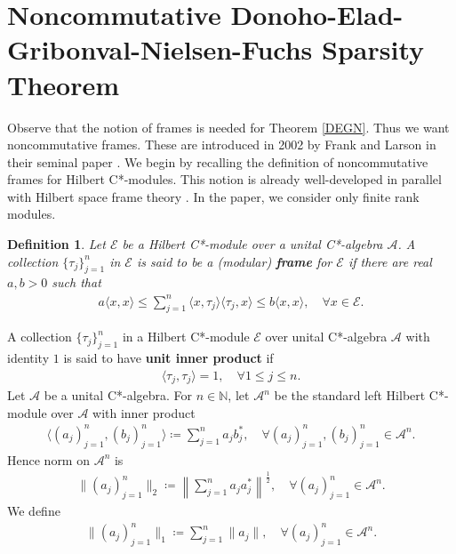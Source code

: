 \documentclass{amsart}
\newtheorem{definition}[theorem]{Definition}
\begin{document}
\section{Noncommutative Donoho-Elad-Gribonval-Nielsen-Fuchs Sparsity Theorem}
 Observe that the notion of frames is needed for Theorem \ref{DEGN}. Thus we want noncommutative frames. These are introduced in 2002 by Frank and Larson in their seminal paper \cite{FRANKLARSON}. We begin by  recalling  the definition of noncommutative  frames for Hilbert C*-modules. This notion is already well-developed in parallel with Hilbert space frame theory \cite{RAEBURNTHOMPSON, ARAMBASIC, HANJINGMOHAPATRA}. In the paper, 	we consider only finite rank modules. 
\begin{definition}\cite{FRANKLARSON}
	Let 	 $\mathcal{E}$ be a Hilbert C*-module over a  unital C*-algebra $\mathcal{A}$. A collection $\{\tau_j\}_{j=1}^n $ in  $\mathcal{E}$ is said to be a (modular) \textbf{frame} for  $\mathcal{E}$ if there are real $a, b>0$ such that 
	\begin{align*}
	a	\langle x, x \rangle \leq   \sum_{j=1}^n  \langle x, \tau_j \rangle \langle \tau_j, x \rangle \leq b \langle x, x \rangle,   \quad \forall x \in \mathcal{E}.
	\end{align*}
\end{definition}
A collection  $\{\tau_j\}_{j=1}^n $ in a Hilbert C*-module $\mathcal{E}$  over unital C*-algebra $\mathcal{A}$ with identity $1$  is said to have \textbf{unit inner product} if
\begin{align*}
	\langle \tau_j, \tau_j \rangle =1, \quad \forall 1\leq j \leq n.
\end{align*}
Let  $\mathcal{A}$ be a unital C*-algebra. For $n \in \mathbb{N}$, let $\mathcal{A}^n$ be the standard left Hilbert C*-module over $\mathcal{A}$ with inner product 
\begin{align*}
	\langle (a_j)_{j=1}^n, (b_j)_{j=1}^n\rangle \coloneqq \sum_{j=1}^{n}a_jb_j^*, \quad \forall (a_j)_{j=1}^n, (b_j)_{j=1}^n \in \mathcal{A}^n.
\end{align*}
Hence norm on $\mathcal{A}^n$ is 
\begin{align*}
	\|(a_j)_{j=1}^n\|_2\coloneqq \left\|\sum_{j=1}^{n}a_ja_j^*\right\|^\frac{1}{2}, \quad \forall (a_j)_{j=1}^n \in \mathcal{A}^n.
\end{align*}
We define 
\begin{align*}
	\|(a_j)_{j=1}^n\|_1\coloneqq \sum_{j=1}^{n}\|a_j\|, \quad \forall (a_j)_{j=1}^n \in \mathcal{A}^n.	
\end{align*}
\end{document}
